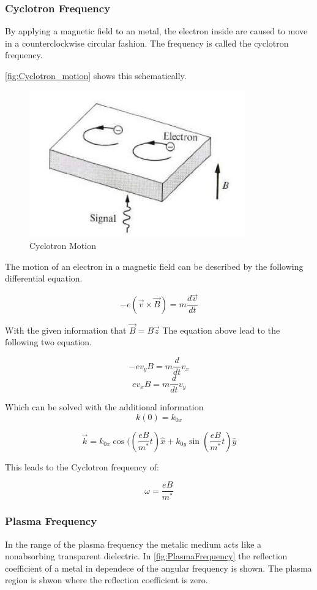 \subsubsection*{Cyclotron Frequency}

By applying a magnetic field to an metal, the electron inside are 
caused to move in a counterclockwise circular fashion. 
The frequency is called the cyclotron frequency.

\autoref{fig:Cyclotron_motion} shows this schematically. 

\begin{figure}[H]
    \centering
    \includegraphics[width=0.4\linewidth]{Graphics/Chapter1/cyclotron_motion.png}
    \caption{Cyclotron Motion \cite[Elementary Solid State Physics p. 160]{elementary_SSP} }
    \label{fig:Cyclotron_motion}
\end{figure}

The motion of an electron in a magnetic field can be 
described by the following differential equation.

\begin{equation}
    -e (\vec{v} \times \vec{B}) =  m \frac{d\vec{v}}{dt}
\end{equation}

With the given information that $\vec{B} = B\vec{z}$
The equation above lead to the following two 
equation.

$$-e v_y B = m \frac{d}{dt}v_x$$
$$e v_x B = m \frac{d}{dt}v_y$$

Which can be solved with the additional information $$k(0) = k_{0x}$$

$$\vec{k} = k_{0x} \cos(\left(\frac{eB}{m^*}t\right) \hat{x} +  k_{0y} \sin \left(\frac{eB}{m^*}t\right) \hat{y}$$

This leads to the Cyclotron frequency of:

$$\omega = \frac{eB}{m^*}$$

\subsubsection*{Plasma Frequency}

In the range of the plasma frequency the metalic medium acts
like a nonabsorbing transparent dielectric.
In \autoref{fig:PlasmaFrequency} the reflection coefficient
of a metal in dependece of the angular frequency is shown. 
The plasma region is shwon where the reflection coefficient is 
zero.

